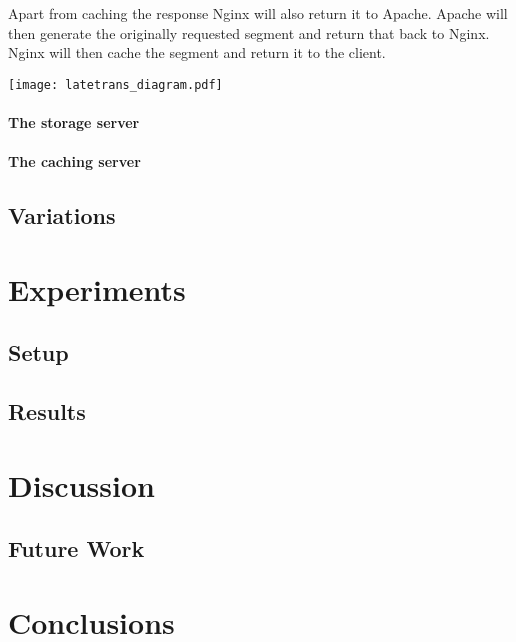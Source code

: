 \documentclass[twoside,openright]{uva-bachelor-thesis}
\begin{document}
Apart from caching the response Nginx will also return it to Apache. Apache will
then generate the originally requested segment and return that back to Nginx.
Nginx will then cache the segment and return it to the client.

\texttt{[image: latetrans\_diagram.pdf]}
\subsubsection{The storage server}
\subsubsection{The caching server}
\section{Variations}

\chapter{Experiments}
\section{Setup}
\section{Results}

\chapter{Discussion}
\section{Future Work}
\chapter{Conclusions}


\printbibliography{}
\end{document}
